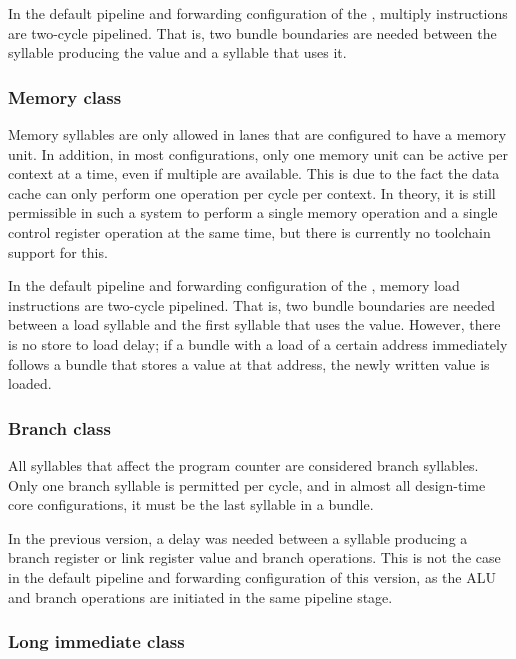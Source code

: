 In the default pipeline and forwarding configuration of the \rvex{}, multiply 
instructions are two-cycle pipelined. That is, two bundle boundaries are needed 
between the syllable producing the value and a syllable that uses it.


\subsubsection{Memory class}
\label{sec:core-ug-isa-syl-classes-mem}

Memory syllables are only allowed in lanes that are configured to have a memory 
unit. In addition, in most configurations, only one memory unit can be active 
per context at a time, even if multiple are available. This is due to the fact 
the data cache can only perform one operation per cycle per context. In theory, 
it is still permissible in such a system to perform a single memory operation 
and a single control register operation at the same time, but there is currently
no toolchain support for this.

In the default pipeline and forwarding configuration of the \rvex{}, memory load
instructions are two-cycle pipelined. That is, two bundle boundaries are needed 
between a load syllable and the first syllable that uses the value. However,
there is no store to load delay; if a bundle with a load of a certain address
immediately follows a bundle that stores a value at that address, the newly
written value is loaded.


\subsubsection{Branch class}
\label{sec:core-ug-isa-syl-classes-br}

All syllables that affect the program counter are considered branch syllables. 
Only one branch syllable is permitted per cycle, and in almost all design-time 
core configurations, it must be the last syllable in a bundle.

In the previous \rvex{} version, a delay was needed between a syllable producing
a branch register or link register value and branch operations. This is not the
case in the default pipeline and forwarding configuration of this \rvex{}
version, as the ALU and branch operations are initiated in the same pipeline
stage.


\subsubsection{Long immediate class}
\label{sec:core-ug-isa-syl-classes-limm}

